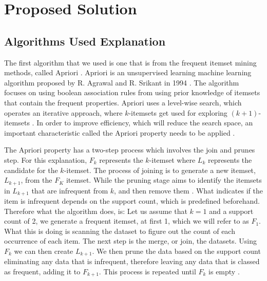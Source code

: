 \documentclass[a4paper,10pt]{article}
\begin{document}
\section{Proposed Solution}

\subsection{Algorithms Used Explanation}

The first algorithm that we used is one that is from the frequent itemset mining methods, called Apriori \cite{han2011data}. Apriori is an unsupervised learning machine learning algorithm proposed by R. Agrawal and R. Srikant in 1994 \cite{agrawal1994fast, geron2019hands}. The algorithm focuses on using boolean association rules \cite{agrawal1994fast} from using prior knowledge of itemsets that contain the frequent properties. Apriori uses a level-wise search, which operates an iterative approach, where $k$-itemsets get used for exploring $(k+1)$-itemsets \cite{jingjingslides}. In order to improve efficiency, which will reduce the search space, an important characteristic called the Apriori property needs to be applied \cite{han2011data}. 

The Apriori property has a two-step process which involves the join and prunes step. For this explanation, $F_k$ represents the $k$-itemset where $L_k$ represents the candidate for the $k$-itemset. The process of joining is to generate a new itemset, $L_{k+1}$, from the $F_K$ itemset. While the pruning stage aims to identify the itemsets in $L_{k+1}$ that are infrequent from $k$, and then remove them \cite{jingjingslides}. What indicates if the item is infrequent depends on the support count, which is predefined beforehand. Therefore what the algorithm does, is: Let us assume that $k=1$ and a support count of 2, we generate a frequent itemset, at first 1, which we will refer to as $F_1$. What this is doing is scanning the dataset to figure out the count of each occurrence of each item. The next step is the merge, or join, the datasets. Using $F_k$ we can then create $L_{k+1}$. We then prune the data based on the support count eliminating any data that is infrequent, therefore leaving any data that is classed as frequent, adding it to $F_{k+1}$. This process is repeated until $F_k$ is empty \cite{jingjingslides, han2011data}.
\end{document}

